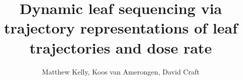 

\title{Dynamic leaf sequencing via trajectory representations of leaf trajectories and dose rate}

\author{Matthew Kelly, Koos van Amerongen, David Craft}



\maketitle
\thispagestyle{empty}

















